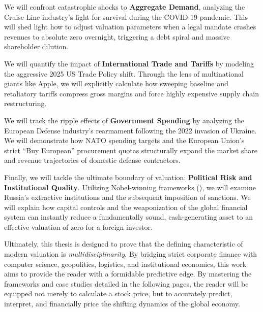 We will confront catastrophic shocks to \textbf{Aggregate Demand}, analyzing the Cruise Line industry's fight for survival during the COVID-19 pandemic. This will shed light how to adjust valuation parameters when a legal mandate crashes revenues to absolute zero overnight, triggering a debt spiral and massive shareholder dilution.

We will quantify the impact of \textbf{International Trade and Tariffs} by modeling the aggressive 2025 US Trade Policy shift. Through the lens of multinational giants like Apple, we will explicitly calculate how sweeping baseline and retaliatory tariffs compress gross margins and force highly expensive supply chain restructuring.

We will track the ripple effects of \textbf{Government Spending} by analyzing the European Defense industry's rearmament following the 2022 invasion of Ukraine. We will demonstrate how NATO spending targets and the European Union's strict ``Buy European'' procurement quotas structurally expand the market share and revenue trajectories of domestic defense contractors.

Finally, we will tackle the ultimate boundary of valuation: \textbf{Political Risk and Institutional Quality}. Utilizing Nobel-winning frameworks (\textcite{acemoglu2012nations}), we will examine Russia's extractive institutions and the subsequent imposition of sanctions. We will explain how capital controls and the weaponization of the global financial system can instantly reduce a fundamentally sound, cash-generating asset to an effective valuation of zero for a foreign investor.

\vspace{0.5cm}

Ultimately, this thesis is designed to prove that the defining characteristic of modern valuation is \textit{multidisciplinarity}. By bridging strict corporate finance with computer science, geopolitics, logistics, and institutional economics, this work aims to provide the reader with a formidable predictive edge. By mastering the frameworks and case studies detailed in the following pages, the reader will be equipped not merely to calculate a stock price, but to accurately predict, interpret, and financially price the shifting dynamics of the global economy.
